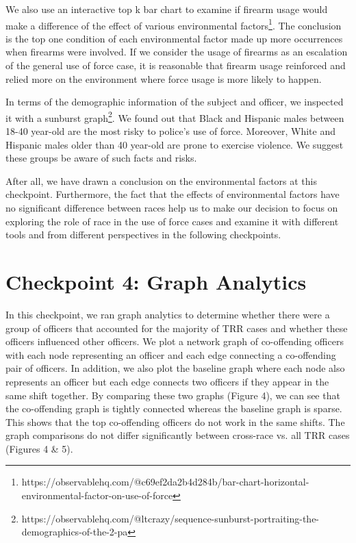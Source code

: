\documentclass[10pt]{article}
\begin{document}
We also use an interactive top k bar chart to examine if firearm usage would make a difference of the effect of various environmental factors\footnote{https://observablehq.com/@c69ef2da2b4d284b/bar-chart-horizontal-environmental-factor-on-use-of-force}. The conclusion is the top one condition of each environmental factor made up more occurrences when firearms were involved. If we consider the usage of firearms as an escalation of the general use of force case, it is reasonable that firearm usage reinforced and relied more on the environment where force usage is more likely to happen.

In terms of the demographic information of the subject and officer, we inspected it with a sunburst graph\footnote{https://observablehq.com/@ltcrazy/sequence-sunburst-portraiting-the-demographics-of-the-2-pa}. We found out that Black and Hispanic males between 18-40 year-old are the most risky to police’s use of force. Moreover, White and Hispanic males older than 40 year-old are prone to exercise violence. We suggest these groups be aware of such facts and risks.

After all, we have drawn a conclusion on the environmental factors at this checkpoint. Furthermore, the fact that the effects of environmental factors have no significant difference between races help us to make our decision to focus on exploring the role of race in the use of force cases and examine it with different tools and from different perspectives in the following checkpoints.



\section*{Checkpoint 4: Graph Analytics}

In this checkpoint, we ran graph analytics to determine whether there were a group of officers that accounted for the majority of TRR cases and whether these officers influenced other officers. We plot a network graph of co-offending officers with each node representing an officer and each edge connecting a co-offending pair of officers. In addition, we also plot the baseline graph where each node also represents an officer but each edge connects two officers if they appear in the same shift together. By comparing these two graphs (Figure 4), we can see that the co-offending graph is tightly connected whereas the baseline graph is sparse. This shows that the top co-offending officers do not work in the same shifts. The graph comparisons do not differ significantly between cross-race vs. all TRR cases (Figures 4 \& 5).
\end{document}
